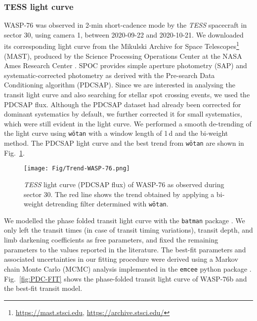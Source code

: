 \documentclass{aa}
\begin{document}
\subsubsection{TESS light curve} \label{sec:spots}

WASP-76 was observed in 2-min short-cadence mode by the \textit{TESS} spacecraft in sector 30, using camera 1, between 2020-09-22 and 2020-10-21. We downloaded its corresponding light curve from the Mikulski Archive for Space Telescopes\footnote{\url{https://mast.stsci.edu}, \url{https://archive.stsci.edu/}} (MAST), produced by the Science Processing Operations Center at the NASA Ames Research Center \citep[SPOC;][]{SPOC}. SPOC provides simple aperture photometry (SAP) and systematic-corrected photometry as derived with the Pre-search Data Conditioning algorithm (PDCSAP). Since we are interested in analysing the transit light curve and also searching for stellar spot crossing events, we used the PDCSAP flux. Although the PDCSAP dataset had already been corrected for dominant systematics by default, we further corrected it for small systematics, which were still evident in the light curve. We performed a smooth de-trending of the light curve using \texttt{w{\={o}}tan} \citep{Hippke-19} with a window length of 1\,d and the bi-weight method. The PDCSAP light curve and the best trend from \texttt{w{\={o}}tan} are shown in Fig.~\ref{fig:PDC-WOTAN}. %

\begin{figure}[]
\centering
\texttt{[image: Fig/Trend-WASP-76.png]}
\caption{{\em TESS} light curve (PDCSAP flux) of WASP-76 as observed during sector 30. The red line shows the trend obtained by applying a bi-weight detrending filter determined with \texttt{w{\={o}}tan}.}
\label{fig:PDC-WOTAN}
\end{figure}


We modelled the phase folded transit light curve with the \texttt{batman} package \citep{batman}. We only left the transit times (in case of transit timing variations), transit depth, and limb darkening coefficients as free parameters, and fixed the remaining parameters to the values reported in the literature. The best-fit parameters and associated uncertainties in our fitting procedure were derived using a Markov chain Monte Carlo (MCMC) analysis implemented in the \texttt{emcee} python package \citep{emcee}. Fig.~\ref{fig:PDC-FIT} shows the phase-folded transit light curve of WASP-76b and the best-fit transit model.
\end{document}
